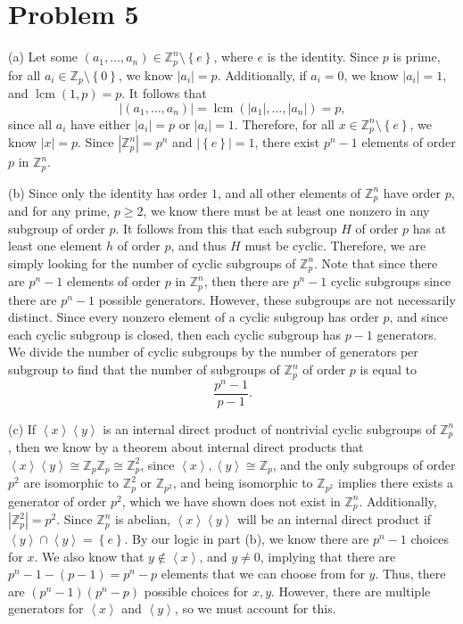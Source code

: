 \documentclass[11pt, letterpaper]{report}
\begin{document}
\section*{Problem 5}
\begin{solution}
	(a) Let some $(a_1, \dots, a_n )\in \mathbb{Z}_p^n \setminus\left\{ e \right\} $, where $e$ is the identity. Since $p$ is prime, for all $a_i\in \mathbb{Z}_p \setminus\left\{ 0 \right\} $, we know $\left| a_i \right| =p$. Additionally, if $a_i=0$, we know $\left| a_i \right| =1$, and $\operatorname{lcm}(1,p) =p$. It follows that
	\[
		\left| \left( a_1, \dots, a_n  \right)  \right| =\operatorname{lcm}(\left| a_1 \right| ,\ldots, \left| a_n \right| ) =p
	,\]
	since all $a_i$ have either $\left| a_i \right| =p$ or $\left| a_i \right| =1$. Therefore, for all $x\in\mathbb{Z}_p^n \setminus \left\{ e \right\} $, we know $\left| x \right| =p$. Since $\left| \mathbb{Z}_p^n \right| =p^n$ and $\left| \left\{ e \right\}  \right| =1$, there exist $p^n-1$ elements of order $p$ in $\mathbb{Z}_p^n$.

	(b) Since only the identity has order $1$, and all other elements of $\mathbb{Z}_p^n$ have order $p$, and for any prime, $p\geq 2$, we know there must be at least one nonzero in any subgroup of order $p$. It follows from this that each subgroup $H$ of order $p$ has at least one element $h$ of order $p$, and thus $H$ must be cyclic. Therefore, we are simply looking for the number of cyclic subgroups of $\mathbb{Z}_p^n$. Note that since there are $p^n-1$ elements of order $p$ in $\mathbb{Z}_p^n$, then there are $p^n-1$ cyclic subgroups since there are $p^n-1$ possible generators. However, these subgroups are not necessarily distinct. Since every nonzero element of a cyclic subgroup has order $p$, and since each cyclic subgroup is closed, then each cyclic subgroup has $p-1$ generators. We divide the number of cyclic subgroups by the number of generators per subgroup to find that the number of subgroups of $\mathbb{Z}_p^n$ of order $p$ is equal to
	\[
		\frac{p^n-1}{p-1}
	.\]

	(c) If $\left<x \right> \left<y \right>$ is an internal direct product of nontrivial cyclic subgroups of $\mathbb{Z}_p^n$, then we know by a theorem about internal direct products that $\left<x \right> \left<y \right> \cong \mathbb{Z}_p\mathbb{Z}_p \cong  \mathbb{Z}_p^2$, since $\left<x \right>,\left<y \right>\cong \mathbb{Z}_p$, and the only subgroups of order $p^2$ are isomorphic to $\mathbb{Z}_p^2$ or $\mathbb{Z}_{p^2}$, and being isomorphic to $\mathbb{Z}_{p^2}$ implies there exists a generator of order $p^2$, which we have shown does not exist in $\mathbb{Z}_p^n$. Additionally, $\left| \mathbb{Z}_p^2 \right| =p^2$. Since $\mathbb{Z}_p^n$ is abelian, $\left<x \right>\left<y \right>$ will be an internal direct product if $\left<y \right>  \cap \left<y \right> =\left\{ e \right\} $. By our logic in part (b), we know there are $p^n-1$ choices for $x$. We also know that $y\notin \left<x \right>$, and $y\neq 0$, implying that there are $p^n-1 - (p-1)=p^n-p$ elements that we can choose from for $y$. Thus, there are $\left( p^n-1 \right) \left( p^n-p \right) $ possible choices for $x,y$. However, there are multiple generators for $\left<x \right>$ and $\left<y \right>$, so we must account for this.
	

\end{solution}
\end{document}
